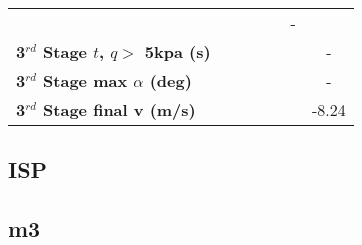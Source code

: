 \begin{tabular}{l c c c c c c}
	& \secondFlightTimeCdNinetyFiveNoReturn
	& \secondFlightTimeCdStandardNoReturn
	& \secondFlightTimeCdOneHundredFiveNoReturn
	& \secondFlightTimeCdOneHundredTenNoReturn
	& -
	\\
	\textbf{3$^{rd}$ Stage $t$, $q >$ 5kpa (s)}
	& \thirdqOverFiveCdNinetyNoReturn
	& \thirdqOverFiveCdNinetyFiveNoReturn
	& \thirdqOverFiveCdStandardNoReturn
	& \thirdqOverFiveCdOneHundredFiveNoReturn
	& \thirdqOverFiveCdOneHundredTenNoReturn
	& -
	\\
	\textbf{3$^{rd}$ Stage max $\alpha$ (deg)}
	& \thirdmaxAoACdNinetyNoReturn
	& \thirdmaxAoACdNinetyFiveNoReturn
	& \thirdmaxAoACdStandardNoReturn
	& \thirdmaxAoACdOneHundredFiveNoReturn
	& \thirdmaxAoACdOneHundredTenNoReturn
	& -
	\\
	\textbf{3$^{rd}$ Stage final v (m/s)}
	& \thirdcircvCdNinetyNoReturn
	& \thirdcircvCdNinetyFiveNoReturn
	& \thirdcircvCdStandardNoReturn
	& \thirdcircvCdOneHundredFiveNoReturn
	& \thirdcircvCdOneHundredTenNoReturn
	&-8.24
	\\
	\hline 
\end{tabular} 

\subsection{ISP}


\subsection{m3}

